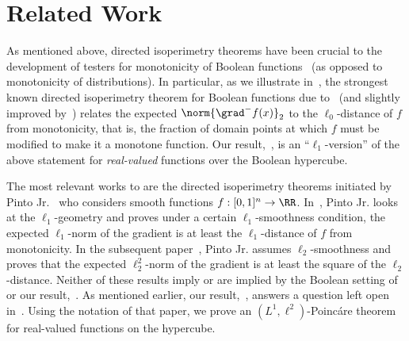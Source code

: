 \section{Related Work}
\label{sec:related}

As mentioned above, directed isoperimetry theorems have been  crucial to the development of testers for monotonicity of Boolean functions~\cite{GGLRS00,ChSe13-j,KMS18} (as opposed to monotonicity of distributions). In particular, as we illustrate in~, the strongest known directed isoperimetry theorem for Boolean functions due to~\cite{KMS18} (and slightly improved by~\cite{PRW22}) relates the expected $\norm{\grad^-f(x)}_2$ to the $\ell_0$-distance of $f$ from monotonicity, that is, the fraction of domain points at which $f$ must be modified to make it a monotone function. Our result,~, is an ``$\ell_1$-version'' of the above statement for {\em real-valued} functions over the Boolean hypercube. 

The most relevant works to  are the directed isoperimetry theorems initiated by Pinto Jr.~\cite{F23, F24} who considers smooth functions $f:[0,1]^n \to \RR$. In~\cite{F23}, Pinto Jr. looks at the $\ell_1$-geometry and proves under a certain $\ell_1$-smoothness condition, the expected $\ell_1$-norm of the gradient is at least the $\ell_1$-distance of $f$ from monotonicity. In the subsequent paper~\cite{F24}, Pinto Jr. assumes $\ell_2$-smoothness and proves that the expected $\ell_2^2$-norm of the gradient is at least the square of the $\ell_2$-distance. Neither of these results imply or are implied by the Boolean setting of~\cite{KMS18} or our result,~. As mentioned earlier, our result,~, answers a question left open in~\cite{F23}.
Using the notation of that paper, we prove an $(L^1, \ell^2)$-Poinc\'{a}re theorem
for real-valued functions on the hypercube.


